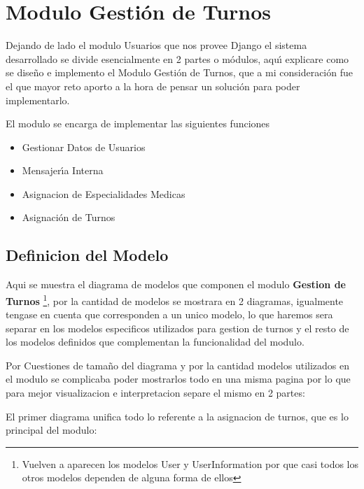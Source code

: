 \section{Modulo Gesti\'on de Turnos}

Dejando de lado el modulo Usuarios que nos provee Django el sistema desarrollado 
se divide esencialmente en 2 partes o m\'odulos, aqu\'{\i} explicare como se dise\~no e
implemento el Modulo Gesti\'on de Turnos, que a mi consideraci\'on fue el que mayor
reto aporto a la hora de pensar un soluci\'on para poder implementarlo.

El modulo se encarga de implementar las siguientes funciones

\begin{itemize}
    \item Gestionar Datos de Usuarios
    \item Mensajer\'{\i}a Interna
    \item Asignacion de Especialidades Medicas
    \item Asignaci\'on de Turnos
\end{itemize}


\subsection{Definicion del Modelo}

Aqui se muestra el diagrama de modelos que componen el modulo \textbf{Gestion 
de Turnos} \footnote{Vuelven a aparecen los modelos User y UserInformation por 
que casi todos los otros modelos dependen de alguna forma de ellos}, por la 
cantidad de modelos se mostrara en 2 diagramas, igualmente tengase en cuenta
que corresponden a un unico modelo, lo que haremos sera separar en los modelos
especificos utilizados para gestion de turnos y el resto de los modelos 
definidos que complementan la funcionalidad del modulo.

Por Cuestiones de tama\~no del diagrama y por la cantidad modelos utilizados en 
el modulo se complicaba poder mostrarlos todo en una misma pagina por lo que 
para mejor visualizacion e interpretacion separe el mismo en 2 partes:

El primer diagrama unifica todo lo referente a la asignacion de turnos, que es lo 
principal del modulo:

